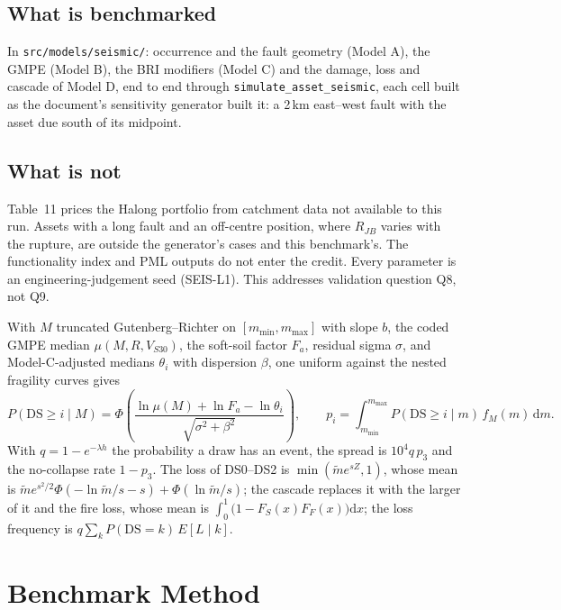 \documentclass[11pt,a4paper]{article}
\begin{document}
\subsection{What is benchmarked}
In \texttt{src/models/seismic/}: occurrence and the fault geometry (Model A), the GMPE
(Model B), the BRI modifiers (Model C) and the damage, loss and cascade of Model D,
end to end through \texttt{simulate\_asset\_seismic}, each cell built as the document's
sensitivity generator built it: a 2\,km east--west fault with the asset due south of
its midpoint.

\subsection{What is not}
Table~11 prices the Halong portfolio from catchment data not available to this run.
Assets with a long fault and an off-centre position, where $R_{JB}$ varies with the
rupture, are outside the generator's cases and this benchmark's. The functionality
index and PML outputs do not enter the credit. Every parameter is an
engineering-judgement seed (SEIS-L1). This addresses validation question Q8, not Q9.

\mkmframework

With $M$ truncated Gutenberg--Richter on $[m_{\min},m_{\max}]$ with slope $b$, the coded
GMPE median $\mu(M,R,V_{S30})$, the soft-soil factor $F_a$, residual sigma $\sigma$, and
Model-C-adjusted medians $\theta_i$ with dispersion $\beta$, one uniform against the
nested fragility curves gives
\begin{equation}
P(\mathrm{DS}\ge i\mid M)=\Phi\!\left(\frac{\ln\mu(M)+\ln F_a-\ln\theta_i}{\sqrt{\sigma^2+\beta^2}}\right),
\qquad
p_i=\int_{m_{\min}}^{m_{\max}}P(\mathrm{DS}\ge i\mid m)\,f_M(m)\,\mathrm{d}m .
\end{equation}
With $q=1-e^{-\lambda h}$ the probability a draw has an event, the spread is $10^4q\,p_3$
and the no-collapse rate $1-p_3$. The loss of DS0--DS2 is $\min(\tilde m e^{sZ},1)$,
whose mean is
$\tilde m e^{s^2/2}\Phi(-\ln\tilde m/s-s)+\Phi(\ln\tilde m/s)$; the cascade replaces it
with the larger of it and the fire loss, whose mean is
$\int_0^1\bigl(1-F_S(x)F_F(x)\bigr)\mathrm{d}x$; the loss frequency is
$q\sum_k P(\mathrm{DS}=k)\,E[L\mid k]$.

\section{Benchmark Method}
\end{document}
